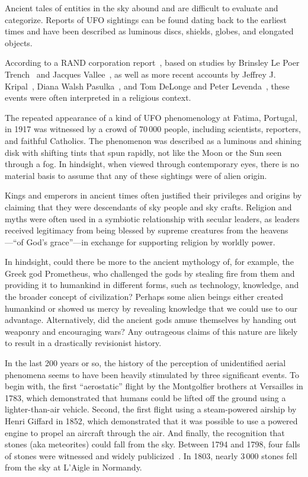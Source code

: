 Ancient tales of entities in the sky abound and are difficult to evaluate and categorize.
Reports of UFO sightings can be found dating back to the earliest times and have been described as luminous discs, shields, globes, and elongated objects.

According to a RAND corporation report~\cite{Kocher-RAND-1968Jan},
based on studies by Brinsley Le Poer Trench~\cite{lePoerTrench1961Jan} and Jacques Vallee~\cite{Vallee1965Jan},
as well as more recent accounts by Jeffrey J. Kripal~\cite{Kripal2011Nov}, Diana Walsh Pasulka~\cite{Pasulka2019Feb},
and Tom DeLonge and Peter Levenda~\cite{DeLongeLevenda-Gods,DeLongeLevenda-Men}, these events were often interpreted in a religious context.

The repeated appearance of a kind of UFO phenomenology at Fatima, Portugal, in 1917 was witnessed by a crowd of 70\,000 people,
including scientists, reporters, and faithful Catholics.
The phenomenon was described as a luminous and shining disk with shifting tints that spun rapidly,
not like the Moon or the Sun seen through a fog.
In hindsight, when viewed through contemporary eyes, there is no material basis to assume that any of these sightings were of alien origin.

Kings and emperors in ancient times often justified their privileges and origins by claiming that they were descendants of sky people and sky crafts.
Religion and myths were often used in a symbiotic relationship with secular leaders,
as leaders received legitimacy from being blessed by supreme creatures from the heavens---``of God's grace''---in
exchange for supporting religion by worldly power.

In hindsight, could there be more to the ancient mythology of, for example, the Greek god Prometheus, who challenged the gods by stealing fire from them and providing it to humankind in different forms, such as technology, knowledge, and the broader concept of civilization? Perhaps some alien beings either created humankind or showed us mercy by revealing knowledge that we could use to our advantage. Alternatively, did the ancient gods amuse themselves by handing out weaponry and encouraging wars?
Any outrageous claims of this nature are likely to result in a drastically revisionist history.


In the last 200 years or so, the history of the perception of unidentified aerial
phenomena seems to have been heavily stimulated by three significant events.
To begin with, the first ``aerostatic'' flight by the Montgolfier brothers at Versailles in 1783, which
demonstrated that humans could be lifted off the ground using a lighter-than-air vehicle.
Second, the first flight using a steam-powered airship by Henri Giffard in 1852,
which demonstrated that it was possible to use a powered engine to propel an aircraft through the air.
And finally, the recognition that stones (aka meteorites) could fall from the sky.
Between 1794 and 1798, four falls of stones were witnessed and widely publicized~\cite{Marvin_1996}. In 1803, nearly 3\,000 stones fell from the sky at L'Aigle in Normandy.

